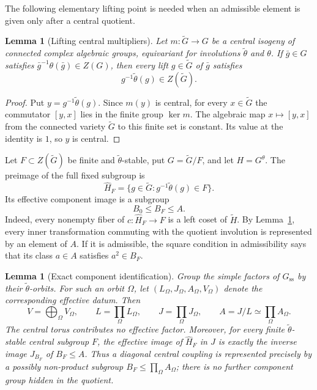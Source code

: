 \documentclass[10pt,a4paper]{amsart}
\numberwithin{equation}{section}
\newtheorem{lemma}[theorem]{Lemma}
\begin{document}
The following elementary lifting point is needed when an admissible element is
given only after a central quotient.

\begin{lemma}[Lifting central multipliers]\label{lem:lifting-multiplier}
Let $m:\widetilde G\to G$ be a central isogeny of connected complex algebraic
groups, equivariant for involutions $\widetilde\theta$ and $\theta$.  If
$\bar g\in G$ satisfies
$\bar g^{-1}\theta(\bar g)\in Z(G)$, then every lift $g\in\widetilde G$ of
$\bar g$ satisfies
\[
 g^{-1}\widetilde\theta(g)\in Z(\widetilde G).
\]
\end{lemma}

\begin{proof}
Put $y=g^{-1}\widetilde\theta(g)$.  Since $m(y)$ is central, for every
$x\in\widetilde G$ the commutator $[y,x]$ lies in the finite group $\ker m$.
The algebraic map $x\mapsto[y,x]$ from the connected variety
$\widetilde G$ to this finite set is constant.  Its value at the identity is
$1$, so $y$ is central.
\end{proof}

Let $F\subset Z(\widetilde G)$ be finite and $\widetilde\theta$-stable, put
$G=\widetilde G/F$, and let $H=G^\theta$.  The preimage of the full fixed
subgroup is
\begin{equation}\label{eq:preimage-fixed}
 \widehat H_F
 =\{g\in\widetilde G:g^{-1}\widetilde\theta(g)\in F\}.
\end{equation}
Its effective component image is a subgroup
\[
 B_0\leq B_F\leq A.
\]
Indeed, every nonempty fiber of $c:\widehat H_F\to F$ is a left coset of
$\widetilde H$.  By Lemma~\ref{lem:lifting-multiplier}, every inner
transformation commuting with the quotient involution is represented by an
element of $A$.  If it is admissible, the square condition in admissibility
says that its class $a\in A$ satisfies $a^2\in B_F$.

\begin{lemma}[Exact component identification]
\label{lem:exact-component-identification}
Group the simple factors of $G_{\mathrm{ss}}$ by their
$\widetilde\theta$-orbits.  For such an orbit $\Omega$, let
$(L_\Omega,J_\Omega,A_\Omega,V_\Omega)$ denote the corresponding effective
datum.  Then
\[
 V=\bigoplus_\Omega V_\Omega,\qquad
 L=\prod_\Omega L_\Omega,\qquad
 J=\prod_\Omega J_\Omega,\qquad
 A=J/L\simeq\prod_\Omega A_\Omega.
\]
The central torus contributes no effective factor.  Moreover, for every
finite $\widetilde\theta$-stable central subgroup $F$, the effective image of
$\widehat H_F$ in $J$ is exactly the inverse image $J_{B_F}$ of $B_F\leq A$.
Thus a diagonal central coupling is represented precisely by a possibly
non-product subgroup $B_F\leq\prod_\Omega A_\Omega$; there is no further
component group hidden in the quotient.
\end{lemma}
\end{document}
